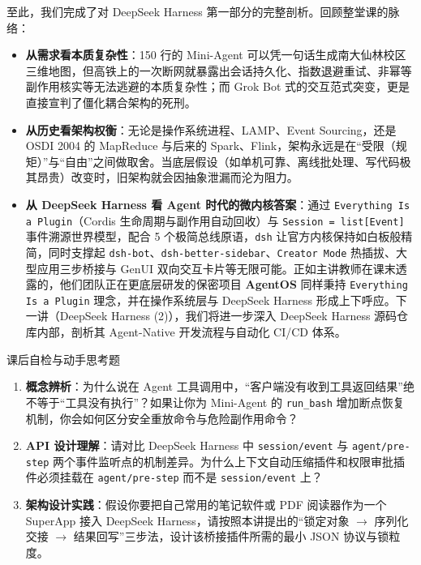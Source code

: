 \documentclass[a4paper]{article}
\begin{document}
至此，我们完成了对 DeepSeek Harness 第一部分的完整剖析。回顾整堂课的脉络：
\begin{itemize}
    \item \textbf{从需求看本质复杂性}：150 行的 Mini-Agent 可以凭一句话生成南大仙林校区三维地图，但高铁上的一次断网就暴露出会话持久化、指数退避重试、非幂等副作用核实等无法逃避的本质复杂性；而 Grok Bot 式的交互范式突变，更是直接宣判了僵化耦合架构的死刑。
    \item \textbf{从历史看架构权衡}：无论是操作系统进程、LAMP、Event Sourcing，还是 OSDI 2004 的 MapReduce 与后来的 Spark、Flink，架构永远是在“受限（规矩）”与“自由”之间做取舍。当底层假设（如单机可靠、离线批处理、写代码极其昂贵）改变时，旧架构就会因抽象泄漏而沦为阻力。
    \item \textbf{从 DeepSeek Harness 看 Agent 时代的微内核答案}：通过 \texttt{Everything Is a Plugin}（Cordis 生命周期与副作用自动回收）与 \texttt{Session = list[Event]} 事件溯源世界模型，配合 5 个极简总线原语，\texttt{dsh} 让官方内核保持如白板般精简，同时支撑起 \texttt{dsh-bot}、\texttt{dsh-better-sidebar}、\texttt{Creator Mode} 热插拔、大型应用三步桥接与 GenUI 双向交互卡片等无限可能。正如主讲教师在课末透露的，他们团队正在更底层研发的保密项目 \textbf{AgentOS} 同样秉持 \texttt{Everything Is a Plugin} 理念，并在操作系统层与 DeepSeek Harness 形成上下呼应。下一讲（DeepSeek Harness (2)），我们将进一步深入 DeepSeek Harness 源码仓库内部，剖析其 Agent-Native 开发流程与自动化 CI/CD 体系。
\end{itemize}

\begin{knowledgebox}{课后自检与动手思考题}
\begin{enumerate}
    \item \textbf{概念辨析}：为什么说在 Agent 工具调用中，“客户端没有收到工具返回结果”绝不等于“工具没有执行”？如果让你为 Mini-Agent 的 \texttt{run\_bash} 增加断点恢复机制，你会如何区分安全重放命令与危险副作用命令？
    \item \textbf{API 设计理解}：请对比 DeepSeek Harness 中 \texttt{session/event} 与 \texttt{agent/pre-step} 两个事件监听点的机制差异。为什么上下文自动压缩插件和权限审批插件必须挂载在 \texttt{agent/pre-step} 而不是 \texttt{session/event} 上？
    \item \textbf{架构设计实践}：假设你要把自己常用的笔记软件或 PDF 阅读器作为一个 SuperApp 接入 DeepSeek Harness，请按照本讲提出的“锁定对象 $\to$ 序列化交接 $\to$ 结果回写”三步法，设计该桥接插件所需的最小 JSON 协议与锁粒度。
\end{enumerate}
\end{knowledgebox}
\end{document}

